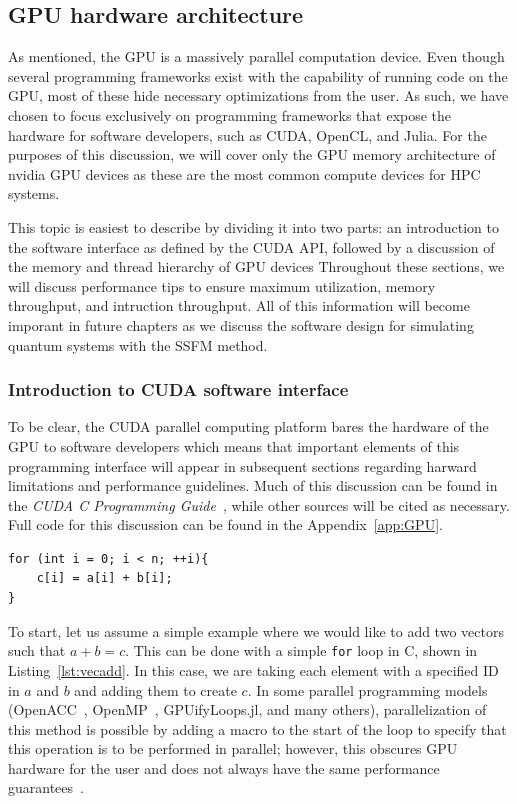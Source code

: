 
\subsection{GPU hardware architecture}

As mentioned, the GPU is a massively parallel computation device.
Even though several programming frameworks exist with the capability of running code on the GPU, most of these hide necessary optimizations from the user.
As such, we have chosen to focus exclusively on programming frameworks that expose the hardware for software developers, such as CUDA, OpenCL, and Julia.
For the purposes of this discussion, we will cover only the GPU memory architecture of nvidia GPU devices as these are the most common compute devices for HPC systems.

This topic is easiest to describe by dividing it into two parts: an introduction to the software interface as defined by the CUDA API, followed by a discussion of the memory and thread hierarchy of GPU devices
Throughout these sections, we will discuss performance tips to ensure maximum utilization, memory throughput, and intruction throughput.
All of this information will become imporant in future chapters as we discuss the software design for simulating quantum systems with the SSFM method.

\subsubsection{Introduction to CUDA software interface}

To be clear, the CUDA parallel computing platform bares the hardware of the GPU to software developers which means that important elements of this programming interface will appear in subsequent sections regarding harward limitations and performance guidelines.
Much of this discussion can be found in the \textit{CUDA C Programming Guide}~\cite{CUDAPG}, while other sources will be cited as necessary.
Full code for this discussion can be found in the Appendix~\ref{app:GPU}.

\begin{lstlisting}[float,label=lst:vecadd,caption={An example of vector addition performed in C or C++ for $a$, $b$, and $c$, all of size $n$},style=c++]
for (int i = 0; i < n; ++i){
    c[i] = a[i] + b[i];
}
\end{lstlisting}

To start, let us assume a simple example where we would like to add two vectors such that $a + b = c$.
This can be done with a simple \texttt{for} loop in C, shown in Listing~\ref{lst:vecadd}.
In this case, we are taking each element with a specified ID  in $a$ and $b$ and adding them to create $c$.
In some parallel programming models (OpenACC~\cite{wienke2012}, OpenMP~\cite{chandra2001}, GPUifyLoops.jl, and many others), parallelization of this method is possible by adding a macro to the start of the loop to specify that this operation is to be performed in parallel; however, this obscures GPU hardware for the user and does not always have the same performance guarantees~\cite{reyes2012}.

